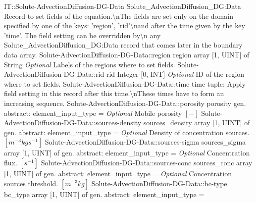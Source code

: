 \begin{RecordType}
	{IT::Solute-AdvectionDiffusion-DG-Data}
	{Solute{\_}AdvectionDiffusion{\_}DG:Data}
	{}%
	{}%
	{{{Record to set fields of the equation.{\textbackslash}nThe fields are set only on the domain specified by one of the keys: 'region', 'rid'{\textbackslash}nand after the time given by the key 'time'. The field setting can be overridden by{\textbackslash}n any Solute{\_}AdvectionDiffusion{\_}DG:Data record that comes later in the boundary data array.}%
}}
		\RecKey
			{Solute-AdvectionDiffusion-DG-Data::region}
			{region}
			{{array [1, UINT] of }{String}}{}
			{ \it{Optional}}
			{{{Labels of the regions where to set fields. }%
}}
		\RecKey
			{Solute-AdvectionDiffusion-DG-Data::rid}
			{rid}
			{{Integer [0, INT]}}{}
			{ \it{Optional}}
			{{{ID of the region where to set fields.}%
}}
		\RecKey
			{Solute-AdvectionDiffusion-DG-Data::time}
			{time}
			{{tuple: }}{}
			{ }
			{{{Apply field setting in this record after this time.{\textbackslash}nThese times have to form an increasing sequence.}%
}}
		\RecKey
			{Solute-AdvectionDiffusion-DG-Data::porosity}
			{porosity}
			{{gen. abstract: }}{{element{\_}input{\_}type}{ = }}
			{ \it{Optional}}
			{{{Mobile porosity }{$[-]$}%
}}
		\RecKey
			{Solute-AdvectionDiffusion-DG-Data::sources-density}
			{sources{\_}density}
			{{array [1, UINT] of }{gen. abstract: }}{{element{\_}input{\_}type}{ = }}
			{ \it{Optional}}
			{{{Density of concentration sources. }{$[m^{-3}kgs^{-1}]$}%
}}
		\RecKey
			{Solute-AdvectionDiffusion-DG-Data::sources-sigma}
			{sources{\_}sigma}
			{{array [1, UINT] of }{gen. abstract: }}{{element{\_}input{\_}type}{ = }}
			{ \it{Optional}}
			{{{Concentration flux. }{$[s^{-1}]$}%
}}
		\RecKey
			{Solute-AdvectionDiffusion-DG-Data::sources-conc}
			{sources{\_}conc}
			{{array [1, UINT] of }{gen. abstract: }}{{element{\_}input{\_}type}{ = }}
			{ \it{Optional}}
			{{{Concentration sources threshold. }{$[m^{-3}kg]$}%
}}
		\RecKey
			{Solute-AdvectionDiffusion-DG-Data::bc-type}
			{bc{\_}type}
			{{array [1, UINT] of }{gen. abstract: }}{{element{\_}input{\_}type}{ = }}

\end{RecordType}

